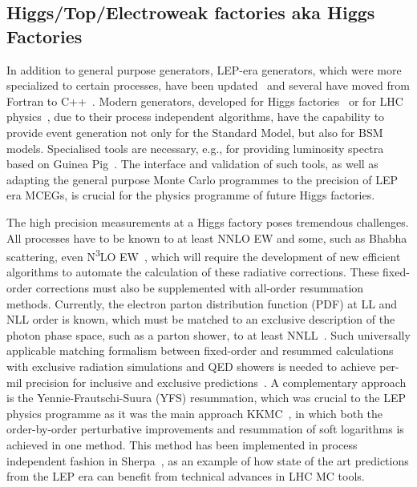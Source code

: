 \documentclass[10pt,a4paper]{article}
\begin{document}
\subsection{Higgs/Top/Electroweak factories aka Higgs
Factories}\label{higgstopelectroweak-factories-aka-higgs-factories}

In addition to general purpose generators, LEP-era generators, which were more
specialized to certain processes, have been
updated~\cite{Jadach:1999vf,CarloniCalame:2003yt,Jadach:1991by,Denner:2000bj}
and several have moved from Fortran to C++~\cite{Jadach:2022mbe, Sjostrand:2014zea}.
Modern generators, developed for Higgs factories~\cite{Kilian:2007gr, Sherpa:2024mfk}
or for LHC physics~\cite{Frixione:2021zdp,Sherpa:2019gpd},  due to their process
independent algorithms, have the capability to provide event generation not only
for the Standard Model, but also for BSM models. Specialised tools are necessary,
e.g., for providing luminosity spectra~\cite{Ohl:1996fi} based on Guinea Pig~\cite{Schulte:1998au}.
The interface and validation of such tools, as well as adapting the general purpose
Monte Carlo programmes to the precision of LEP era MCEGs, is crucial for the
physics programme of future Higgs factories.

The high precision measurements at a Higgs factory poses tremendous challenges.
All processes have to be known to at least NNLO EW and
some, such as Bhabha scattering, even N\textsuperscript{3}LO
EW~\cite{ECFAHiggsStudy:2025}, which will require the development of new
efficient algorithms to automate the calculation of these radiative corrections.
These fixed-order corrections must also be supplemented with all-order
resummation methods. Currently, the electron parton distribution function (PDF)
at LL and NLL order is known, which must be matched to an exclusive description
of the photon phase space, such as a parton shower, to at least
NNLL~\cite{ECFAHiggsStudy:2025,Bertone:2019hks,Frixione:2019lga}. Such
universally applicable matching formalism between fixed-order and resummed
calculations with exclusive radiation simulations and QED showers is needed to
achieve per-mil precision for inclusive and exclusive
predictions~\cite{Frixione:2022ofv}. A complementary approach is the
Yennie-Frautschi-Suura (YFS) resummation, which was crucial to the LEP physics
programme as it was the main approach KKMC~\cite{Jadach:1999vf}, in which both
the order-by-order perturbative improvements and resummation of soft logarithms
is achieved in one method. This method has been implemented in process
independent fashion in Sherpa~\cite{Krauss:2022ajk}, as an example of how state
of the art predictions from the LEP era can benefit from technical advances in
LHC MC tools.
\end{document}
